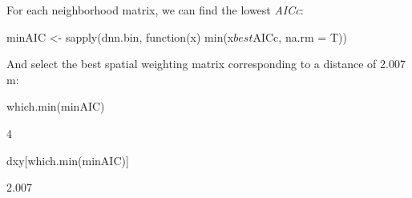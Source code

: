 \documentclass[a4paper]{article}
\begin{document}
For each neighborhood matrix, we can find the lowest \textit{AICc}:
\begin{Schunk}
\begin{Sinput}
 minAIC <- sapply(dnn.bin, function(x) min(x$best$AICc, 
     na.rm = T))
\end{Sinput}
\end{Schunk}
And select the best spatial weighting matrix corresponding to a distance of 2.007 m:
\begin{Schunk}
\begin{Sinput}
 which.min(minAIC)
\end{Sinput}
\begin{Soutput}
[1] 4
\end{Soutput}
\begin{Sinput}
 dxy[which.min(minAIC)]
\end{Sinput}
\begin{Soutput}
[1] 2.007
\end{Soutput}
\end{Schunk}
\end{document}
